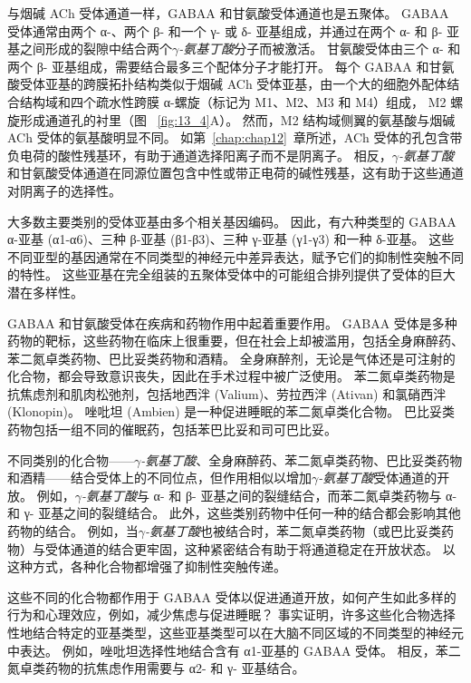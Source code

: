 与烟碱 ACh 受体通道一样，GABAA 和甘氨酸受体通道也是五聚体。
GABAA 受体通常由两个 α-、两个 β- 和一个 γ- 或 δ- 亚基组成，并通过在两个 α- 和 β- 亚基之间形成的裂隙中结合两个\textit{$\gamma$-氨基丁酸}分子而被激活。
甘氨酸受体由三个 α- 和两个 β- 亚基组成，需要结合最多三个配体分子才能打开。
每个 GABAA 和甘氨酸受体亚基的跨膜拓扑结构类似于烟碱 ACh 受体亚基，由一个大的细胞外配体结合结构域和四个疏水性跨膜 α-螺旋（标记为 M1、M2、M3 和 M4）组成， M2 螺旋形成通道孔的衬里（图 ~\ref{fig:13_4}A）。
然而，M2 结构域侧翼的氨基酸与烟碱 ACh 受体的氨基酸明显不同。
如第~\ref{chap:chap12}~章所述，ACh 受体的孔包含带负电荷的酸性残基环，有助于通道选择阳离子而不是阴离子。
相反，\textit{$\gamma$-氨基丁酸}和甘氨酸受体通道在同源位置包含中性或带正电荷的碱性残基，这有助于这些通道对阴离子的选择性。


大多数主要类别的受体亚基由多个相关基因编码。
因此，有六种类型的 GABAA α-亚基 (α1-α6)、三种 β-亚基 (β1-β3)、三种 γ-亚基 (γ1-γ3) 和一种 δ-亚基。
这些不同亚型的基因通常在不同类型的神经元中差异表达，赋予它们的抑制性突触不同的特性。
这些亚基在完全组装的五聚体受体中的可能组合排列提供了受体的巨大潜在多样性。


GABAA 和甘氨酸受体在疾病和药物作用中起着重要作用。
GABAA 受体是多种药物的靶标，这些药物在临床上很重要，但在社会上却被滥用，包括全身麻醉药、苯二氮卓类药物、巴比妥类药物和酒精。
全身麻醉剂，无论是气体还是可注射的化合物，都会导致意识丧失，因此在手术过程中被广泛使用。
苯二氮卓类药物是抗焦虑剂和肌肉松弛剂，包括地西泮 (Valium)、劳拉西泮 (Ativan) 和氯硝西泮 (Klonopin)。
唑吡坦 (Ambien) 是一种促进睡眠的苯二氮卓类化合物。
巴比妥类药物包括一组不同的催眠药，包括苯巴比妥和司可巴比妥。


不同类别的化合物——\textit{$\gamma$-氨基丁酸}、全身麻醉药、苯二氮卓类药物、巴比妥类药物和酒精——结合受体上的不同位点，但作用相似以增加\textit{$\gamma$-氨基丁酸}受体通道的开放。
例如，\textit{$\gamma$-氨基丁酸}与 α- 和 β- 亚基之间的裂缝结合，而苯二氮卓类药物与 α- 和 γ- 亚基之间的裂缝结合。
此外，这些类别药物中任何一种的结合都会影响其他药物的结合。
例如，当\textit{$\gamma$-氨基丁酸}也被结合时，苯二氮卓类药物（或巴比妥类药物）与受体通道的结合更牢固，这种紧密结合有助于将通道稳定在开放状态。
以这种方式，各种化合物都增强了抑制性突触传递。


这些不同的化合物都作用于 GABAA 受体以促进通道开放，如何产生如此多样的行为和心理效应，例如，减少焦虑与促进睡眠？
事实证明，许多这些化合物选择性地结合特定的亚基类型，这些亚基类型可以在大脑不同区域的不同类型的神经元中表达。
例如，唑吡坦选择性地结合含有 α1-亚基的 GABAA 受体。
相反，苯二氮卓类药物的抗焦虑作用需要与 α2- 和 γ- 亚基结合。


